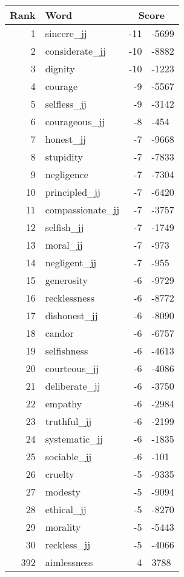 \begin{longtable}[!htbp]{| rlr@{.}l |}
    \hline
    \textbf{Rank} & \textbf{Word} & \multicolumn{2}{c|}{\textbf{Score}} \\
    \hline
    \endhead
    1 & sincere\_jj & -11 & -5699 \\
    2 & considerate\_jj & -10 & -8882 \\
    3 & dignity & -10 & -1223 \\
    4 & courage & -9 & -5567 \\
    5 & selfless\_jj & -9 & -3142 \\
    6 & courageous\_jj & -8 & -454 \\
    7 & honest\_jj & -7 & -9668 \\
    8 & stupidity & -7 & -7833 \\
    9 & negligence & -7 & -7304 \\
    10 & principled\_jj & -7 & -6420 \\
    11 & compassionate\_jj & -7 & -3757 \\
    12 & selfish\_jj & -7 & -1749 \\
    13 & moral\_jj & -7 & -973 \\
    14 & negligent\_jj & -7 & -955 \\
    15 & generosity & -6 & -9729 \\
    16 & recklessness & -6 & -8772 \\
    17 & dishonest\_jj & -6 & -8090 \\
    18 & candor & -6 & -6757 \\
    19 & selfishness & -6 & -4613 \\
    20 & courteous\_jj & -6 & -4086 \\
    21 & deliberate\_jj & -6 & -3750 \\
    22 & empathy & -6 & -2984 \\
    23 & truthful\_jj & -6 & -2199 \\
    24 & systematic\_jj & -6 & -1835 \\
    25 & sociable\_jj & -6 & -101 \\
    26 & cruelty & -5 & -9335 \\
    27 & modesty & -5 & -9094 \\
    28 & ethical\_jj & -5 & -8270 \\
    29 & morality & -5 & -5443 \\
    30 & reckless\_jj & -5 & -4066 \\
    392 & aimlessness & 4 & 3788 \\

\end{longtable}
